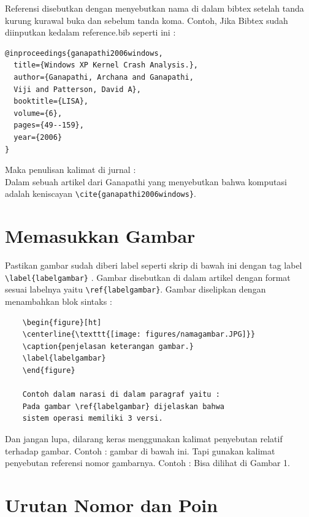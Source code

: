 Referensi disebutkan dengan menyebutkan nama di dalam bibtex setelah tanda kurung kurawal buka dan sebelum tanda koma. Contoh, Jika Bibtex sudah diinputkan kedalam reference.bib seperti ini :
\begin{verbatim}
@inproceedings{ganapathi2006windows,
  title={Windows XP Kernel Crash Analysis.},
  author={Ganapathi, Archana and Ganapathi, 
  Viji and Patterson, David A},
  booktitle={LISA},
  volume={6},
  pages={49--159},
  year={2006}
}
\end{verbatim}
Maka penulisan kalimat di jurnal : \\
Dalam sebuah artikel dari Ganapathi yang 
menyebutkan bahwa komputasi adalah keniscayan \verb|\cite{ganapathi2006windows}|.


\section{Memasukkan Gambar}

Pastikan gambar sudah diberi label seperti skrip di bawah ini dengan tag label \verb|\label{labelgambar}| . Gambar disebutkan di dalam artikel dengan format sesuai labelnya yaitu \verb|\ref{labelgambar}|. Gambar diselipkan dengan menambahkan blok sintaks :
    \begin{verbatim}
    \begin{figure}[ht]
    \centerline{\texttt{[image: figures/namagambar.JPG]}}
    \caption{penjelasan keterangan gambar.}
    \label{labelgambar}
    \end{figure}
    
   	Contoh dalam narasi di dalam paragraf yaitu :
    Pada gambar \ref{labelgambar} dijelaskan bahwa 
    sistem operasi memiliki 3 versi.
    \end{verbatim}

Dan jangan lupa, dilarang keras menggunakan kalimat penyebutan relatif terhadap gambar. Contoh : gambar di bawah ini. Tapi gunakan kalimat penyebutan referensi nomor gambarnya. Contoh : Bisa dilihat di Gambar 1.

\section{Urutan Nomor dan Poin}

